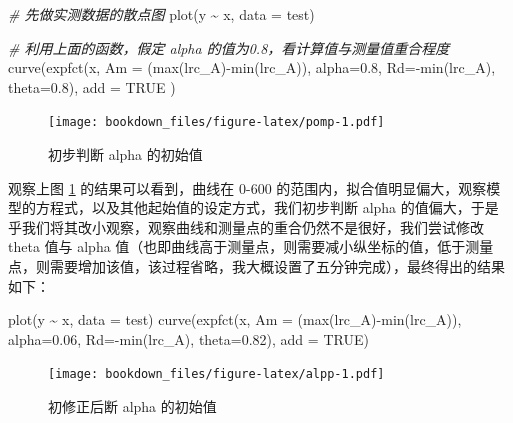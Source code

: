\documentclass[
]{krantz}
\makeatletter
\newenvironment{Shaded}{\begin{snugshade}}{\end{snugshade}}
\newcommand{\AttributeTok}[1]{\textcolor[rgb]{0.77,0.63,0.00}{#1}}
\newcommand{\CommentTok}[1]{\textcolor[rgb]{0.56,0.35,0.01}{\textit{#1}}}
\newcommand{\ConstantTok}[1]{\textcolor[rgb]{0.00,0.00,0.00}{#1}}
\newcommand{\FloatTok}[1]{\textcolor[rgb]{0.00,0.00,0.81}{#1}}
\newcommand{\FunctionTok}[1]{\textcolor[rgb]{0.00,0.00,0.00}{#1}}
\newcommand{\NormalTok}[1]{#1}
\newcommand{\SpecialCharTok}[1]{\textcolor[rgb]{0.00,0.00,0.00}{#1}}
\newenvironment{kframe}{%
\medskip{}
\setlength{\fboxsep}{.8em}
 \def\at@end@of@kframe{}%
 \ifinner\ifhmode%
  \def\at@end@of@kframe{\end{minipage}}%
  \begin{minipage}{\columnwidth}%
 \fi\fi%
 \def\FrameCommand##1{\hskip\@totalleftmargin \hskip-\fboxsep
 \colorbox{shadecolor}{##1}\hskip-\fboxsep
     \hskip-\linewidth \hskip-\@totalleftmargin \hskip\columnwidth}%
 \MakeFramed {\advance\hsize-\width
   \@totalleftmargin\z@ \linewidth\hsize
   \@setminipage}}%
 {\par\unskip\endMakeFramed%
 \at@end@of@kframe}
\renewenvironment{Shaded}{\begin{kframe}}{\end{kframe}}
\makeatother
\begin{document}
\begin{Shaded}
\begin{Highlighting}[]
\CommentTok{\# 先做实测数据的散点图}
\FunctionTok{plot}\NormalTok{(y }\SpecialCharTok{\textasciitilde{}}\NormalTok{ x, }\AttributeTok{data =}\NormalTok{ test)}

\CommentTok{\# 利用上面的函数，假定 alpha 的值为0.8，看计算值与测量值重合程度}
\FunctionTok{curve}\NormalTok{(}\FunctionTok{expfct}\NormalTok{(x, }\AttributeTok{Am =}\NormalTok{ (}\FunctionTok{max}\NormalTok{(lrc\_A)}\SpecialCharTok{{-}}\FunctionTok{min}\NormalTok{(lrc\_A)),}
     \AttributeTok{alpha=}\FloatTok{0.8}\NormalTok{, }\AttributeTok{Rd=}\SpecialCharTok{{-}}\FunctionTok{min}\NormalTok{(lrc\_A), }\AttributeTok{theta=}\FloatTok{0.8}\NormalTok{), }\AttributeTok{add =} \ConstantTok{TRUE}
\NormalTok{             )}
\end{Highlighting}
\end{Shaded}

\begin{figure}
\centering
\texttt{[image: bookdown\_files/figure-latex/pomp-1.pdf]}
\caption{\label{fig:pomp}初步判断 alpha 的初始值}
\end{figure}

观察上图 \ref{fig:pomp} 的结果可以看到，曲线在 0-600 的范围内，拟合值明显偏大，观察模型的方程式，以及其他起始值的设定方式，我们初步判断 alpha 的值偏大，于是乎我们将其改小观察，观察曲线和测量点的重合仍然不是很好，我们尝试修改 theta 值与 alpha 值（也即曲线高于测量点，则需要减小纵坐标的值，低于测量点，则需要增加该值，该过程省略，我大概设置了五分钟完成），最终得出的结果如下：

\begin{Shaded}
\begin{Highlighting}[]
\FunctionTok{plot}\NormalTok{(y }\SpecialCharTok{\textasciitilde{}}\NormalTok{ x, }\AttributeTok{data =}\NormalTok{ test)}
\FunctionTok{curve}\NormalTok{(}\FunctionTok{expfct}\NormalTok{(x, }\AttributeTok{Am =}\NormalTok{ (}\FunctionTok{max}\NormalTok{(lrc\_A)}\SpecialCharTok{{-}}\FunctionTok{min}\NormalTok{(lrc\_A)),}
     \AttributeTok{alpha=}\FloatTok{0.06}\NormalTok{, }\AttributeTok{Rd=}\SpecialCharTok{{-}}\FunctionTok{min}\NormalTok{(lrc\_A), }\AttributeTok{theta=}\FloatTok{0.82}\NormalTok{), }\AttributeTok{add =} \ConstantTok{TRUE}\NormalTok{)}
\end{Highlighting}
\end{Shaded}

\begin{figure}
\centering
\texttt{[image: bookdown\_files/figure-latex/alpp-1.pdf]}
\caption{\label{fig:alpp}初修正后断 alpha 的初始值}
\end{figure}
\end{document}
